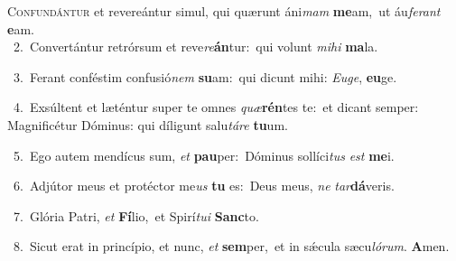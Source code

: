 \lettrine{\initial\textcolor{\initialcolor}{C}}{onfundántur} et revereántur simul, qui quærunt áni\textit{mam} \textbf{me}\-am,~\star ut áu\-\textit{fe}\-\textit{rant} \textbf{e}\-am.\\
{\numbfont\textcolor{\numbcolor}{~2.}}~Convertántur retrórsum et reve\-\textit{re}\-\textbf{án}tur:~\star qui volunt \textit{mi}\-\textit{hi} \textbf{ma}\-la.\par
{\numbfont\textcolor{\numbcolor}{~3.}}~Ferant conféstim confusió\textit{nem} \textbf{su}\-am:~\star qui dicunt mihi: \textit{Eu}\-\textit{ge}, \textbf{eu}\-ge.\par
{\numbfont\textcolor{\numbcolor}{~4.}}~Exsúltent et læténtur super te omnes \textit{quæ}\-\textbf{rén}tes te:~\star et dicant semper: Magnificétur Dóminus: qui díligunt salu\-\textit{tá}\-\textit{re} \textbf{tu}\-um.\par
{\numbfont\textcolor{\numbcolor}{~5.}}~Ego autem mendícus sum, \textit{et} \textbf{pau}\-per:~\star Dóminus sollíci\textit{tus} \textit{est} \textbf{me}\-i.\par
{\numbfont\textcolor{\numbcolor}{~6.}}~Adjútor meus et protéctor me\textit{us} \textbf{tu} es:~\star Deus meus, \textit{ne} \textit{tar}\-\textbf{dá}veris.\par
{\numbfont\textcolor{\numbcolor}{~7.}}~Glória Patri, \textit{et} \textbf{Fí}\-lio,~\star et Spirí\-\textit{tu}\-\textit{i} \textbf{Sanc}\-to.\par
{\numbfont\textcolor{\numbcolor}{~8.}}~Sicut erat in princípio, et nunc, \textit{et} \textbf{sem}\-per,~\star et in sǽcula sæcu\-\textit{ló}\-\textit{rum}. \textbf{A}\-men.\par
